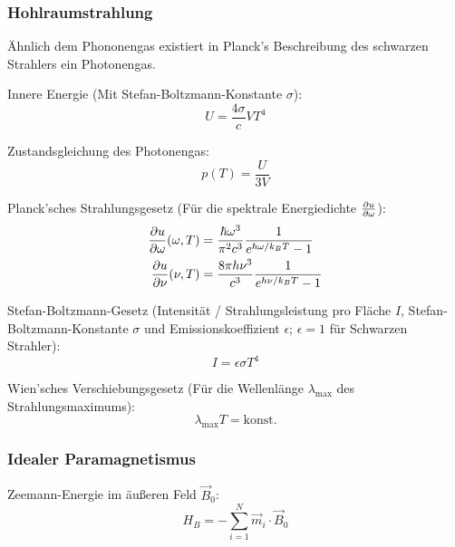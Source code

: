 \documentclass[11pt]{article}
\numberwithin{equation}{section}
\begin{document}
			\subsubsection{Hohlraumstrahlung}
				\noindent
				Ähnlich dem Phononengas existiert in Planck's Beschreibung des schwarzen Strahlers ein Photonengas. \vsp

				\noindent
				Innere Energie (Mit Stefan-Boltzmann-Konstante $\sigma$):
				\begin{equation}
					U = \frac{4\sigma}{c} V T^4
				\end{equation}

				\noindent
				Zustandsgleichung des Photonengas:
				\begin{equation}
					p(T) = \frac{U}{3V}
				\end{equation}

				\noindent
				Planck'sches Strahlungsgesetz (Für die spektrale Energiedichte $\frac{\partial u}{\partial \omega}$):
				\begin{equation}
						\begin{aligned}
								\frac{\partial u}{\partial \omega}(\omega,T) &= \frac{\hbar \omega^3}{\pi^2 c^3} \frac{1}{e^{\hbar \omega / k_B T} - 1} \\
								\frac{\partial u}{\partial \nu} (\nu, T) &= \frac{8 \pi h \nu^3}{c^3} \frac{1}{e^{h \nu / k_B T} - 1} \\
						\end{aligned}
				\end{equation}

				\noindent
				Stefan-Boltzmann-Gesetz (Intensität / Strahlungsleistung pro Fläche $I$, Stefan-Boltzmann-Konstante $\sigma$ und Emissionskoeffizient $\epsilon$; $\epsilon=1$ für Schwarzen Strahler):
				\begin{equation}
					I = \epsilon\sigma T^4
				\end{equation}

				\noindent
				Wien'sches Verschiebungsgesetz (Für die Wellenlänge $\lambda_{\max}$ des Strahlungsmaximums):
				\begin{equation}
					\lambda_{\max} T = \mathrm{konst}.
				\end{equation}

			\subsubsection{Idealer Paramagnetismus}
				\noindent
				Zeemann-Energie im äußeren Feld $\vec{B}_0$:
				\begin{equation}
					H_B = -\sum_{i=1}^N \vec{m}_i \cdot \vec{B}_0
				\end{equation}
\end{document}
